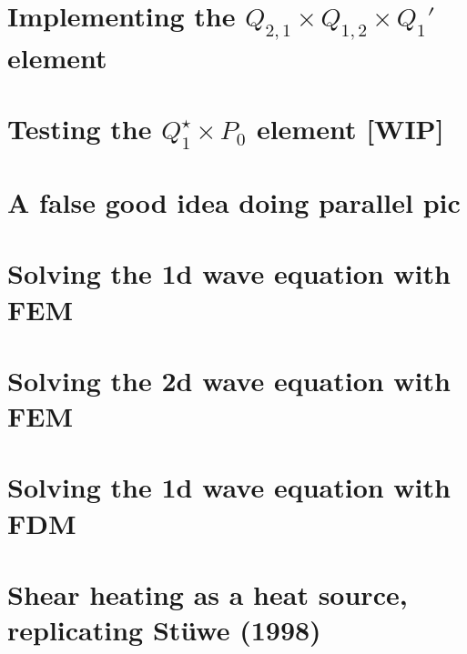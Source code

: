 \documentclass[a4paper,11pt]{report}
\begin{document}
\chapter{Implementing the $Q_{2,1}\times Q_{1,2} \times Q_{1}'$ element \label{f161}} %

\chapter{Testing the $Q_1^\star \times P_0$ element [WIP] \label{f162}} %

\chapter{A false good idea doing parallel pic \label{f163}} %

\chapter{Solving the 1d wave equation with FEM \label{f164}} %

\chapter{Solving the 2d wave equation with FEM \label{f165}} %

\chapter{Solving the 1d wave equation with FDM \label{f166}} %

\chapter{Shear heating as a heat source, replicating St{\"u}we (1998) \label{f167}} %
\end{document}
